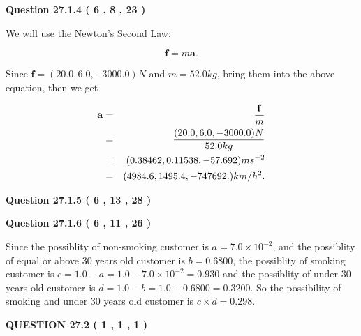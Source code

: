 \documentclass[12pt]{article}
\begin{document}
 
 
  
\vspace{0.2in}
  
{\textbf{\Large{Question
27.1.4 
 (           6 ,           8 ,          23 )
}}}
  
  
 
 

We will use the Newton's Second Law:
 
\[
\mathbf{f}=m\mathbf{a}.
\]
 
Since $\mathbf{f}=( %
20.0,  %
6.0,  %
-3000.0 )N$
and $m= %
52.0kg$, bring them into the above equation, then we get
 
\begin{eqnarray*}
\mathbf{a}&=&\frac{\mathbf{f}}m  \\
&=&\frac{(
20.0 ,
6.0 ,
-3000.0 )N
}{ %
52.0 kg}  \\
&=&(
0.38462 ,
0.11538,
-57.692
)ms^{-2} \\
&=&(
4984.6 ,
1495.4 ,
-747692.
)km/h^2.
\end{eqnarray*}
 
 
 
  
\vspace{0.2in}
  
{\textbf{\Large{Question
27.1.5 
 (           6 ,          13 ,          28 )
}}}
  
  
  
\vspace{0.2in}
  
{\textbf{\Large{Question
27.1.6 
 (           6 ,          11 ,          26 )
}}}
  
  
 
 

Since the possiblity of  %
 non-smoking customer is $ a =  %
7.0 \times 10^{-2} $,
and the possiblity of  %
equal or above 30 years old customer is $ b =  %
0.6800 $,
the possiblity of  %
smoking customer is $ c = 1.0 - a = 1.0 -
7.0 \times 10^{-2}
=  %
0.930 $ and the possiblity of  %
under 30 years old
customer is $ d = 1.0 - b = 1.0 -  %
0.6800 =  %
0.3200  $.
So the possibility of  %
smoking and  %
under 30 years old
customer is $ c \times d =  %
0.298 $.
 
 
 
  
\vspace{0.2in}
  
{\textbf{\Large{QUESTION
27.2 
 (           1 ,           1 ,           1 )
}}}
  
  
\end{document}
